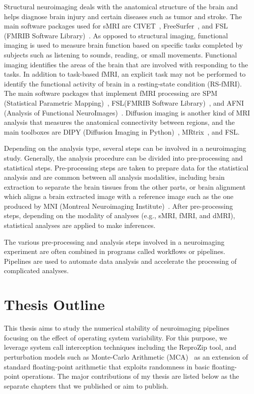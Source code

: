 Structural neuroimaging deals with the anatomical structure of the brain and helps
diagnose brain injury and certain diseases such as tumor and stroke.
The main software packages used for sMRI are 
CIVET~\cite{ad2006civet}, FreeSurfer~\cite{fischl2012freesurfer}, and 
FSL (FMRIB Software Library)~\cite{jenkinson2012fsl}. 
As opposed to structural imaging, functional imaging is used to measure 
brain function based on 
specific tasks completed by subjects such as listening to sounds, 
reading, or small movements. 
Functional imaging identifies the areas of 
the brain that are involved with responding to the tasks. 
In addition to task-based fMRI, an explicit task may not be performed 
to identify the functional activity of brain in a resting-state 
condition (RS-fMRI). The main 
software packages that implement fMRI processing are SPM (Statistical 
Parametric Mapping)~\cite{spm}, FSL(FMRIB Software Library)~\cite{jenkinson2012fsl},
and AFNI (Analysis of Functional 
NeuroImages)~\cite{cox1996afni}. Diffusion imaging is another kind of 
MRI analysis that measures the anatomical connectivity between 
regions, and the main toolboxes are DIPY (Diffusion Imaging in 
Python)~\cite{garyfallidis2014dipy}, MRtrix~\cite{tournier2012mrtrix}, 
and FSL.

Depending on the analysis type, several steps can be involved in a 
neuroimaging study. Generally, the analysis procedure can be divided into 
pre-processing and statistical steps. Pre-processing steps are taken 
to prepare data for the statistical analysis and are common between all 
analysis modalities, including brain extraction to separate the brain 
tissues from the other parts, or brain alignment which aligns a brain 
extracted image with a reference image such as the one produced by 
MNI (Montreal Neuroimaging Institute)~\cite{evans1992anatomical}. 
After pre-processing steps, depending on the
modality of analyses (e.g., sMRI, fMRI, and dMRI), statistical analyses 
are applied to make inferences.

The various pre-processing and analysis steps involved in a 
neuroimaging experiment are often combined in programs called workflows 
or pipelines. Pipelines are used to automate data analysis and accelerate 
the processing of complicated analyses. 


\section{Thesis Outline}

This thesis aims to study the numerical stability of neuroimaging pipelines focusing on the effect
of operating system variability. For this purpose, we leverage system call interception techniques including the
ReproZip tool, and perturbation models such as Monte-Carlo Arithmetic (MCA)~\cite{Parker1997-qq} as an extension of
standard floating-point arithmetic that exploits randomness in basic floating-point operations. The major
contributions of my thesis are listed below as the separate chapters that we published or aim to publish.


